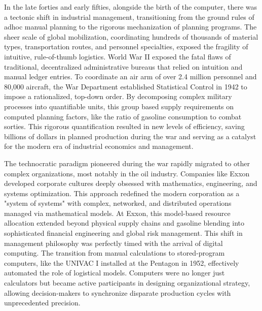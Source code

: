 In the late forties and early fifties, alongside the birth of the computer, there was a tectonic shift in industrial management, transitioning from the ground rules of adhoc manual planning to the rigorous mechanization of planning programs. The sheer scale of global mobilization, coordinating hundreds of thousands of material types, transportation routes, and personnel specialties, exposed the fragility of intuitive, rule-of-thumb logistics. World War II exposed the fatal flaws of traditional, decentralized administrative bureaus that relied on intuition and manual ledger entries. To coordinate an air arm of over 2.4 million personnel and 80,000 aircraft, the War Department established Statistical Control in 1942 to impose a rationalized, top-down order. By decomposing complex military processes into quantifiable units, this group based supply requirements on computed planning factors, like the ratio of gasoline consumption to combat sorties. This rigorous quantification resulted in new levels of efficiency, saving billions of dollars in planned production during the war and serving as a catalyst for the modern era of industrial economics and management. \cite{acombStatisticalControlArmy1952}

The technocratic paradigm pioneered during the war rapidly migrated to other complex organizations, most notably in the oil industry. Companies like Exxon developed corporate cultures deeply obsessed with mathematics, engineering, and systems optimization. This approach redefined the modern corporation as a "system of systems" with complex, networked, and distributed operations managed via mathematical models. At Exxon, this model-based resource allocation extended beyond physical supply chains and gasoline blending into sophisticated financial engineering and global risk management. This shift in management philosophy was perfectly timed with the arrival of digital computing. The transition from manual calculations to stored-program computers, like the UNIVAC I installed at the Pentagon in 1952, effectively automated the role of logistical models. Computers were no longer just calculators but became active participants in designing organizational strategy, allowing decision-makers to synchronize disparate production cycles with unprecedented precision. \cite{charnesBlendingAviationGasolines1952} \cite{garvinApplicationsLinearProgramming1957}

